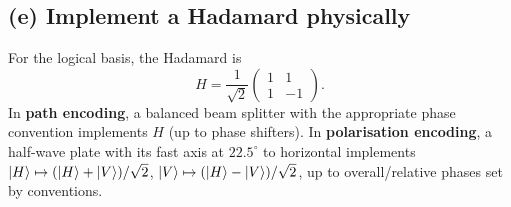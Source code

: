 \subsection*{(e) Implement a Hadamard physically}
For the logical basis, the Hadamard is
\[
H=\frac1{\sqrt2}\begin{pmatrix}1&1\\1&-1\end{pmatrix}.
\]
In \textbf{path encoding}, a balanced beam splitter
with the appropriate phase convention implements \(H\)
(up to phase shifters). In \textbf{polarisation encoding},
a half-wave plate with its fast axis at \(22.5^\circ\)
to horizontal implements
\(\left\lvert H\right\rangle\mapsto(\left\lvert H\right\rangle+\left\lvert V\right\rangle)/\sqrt2\),
\(\left\lvert V\right\rangle\mapsto(\left\lvert H\right\rangle-\left\lvert V\right\rangle)/\sqrt2\),
up to overall/relative phases set by conventions.
